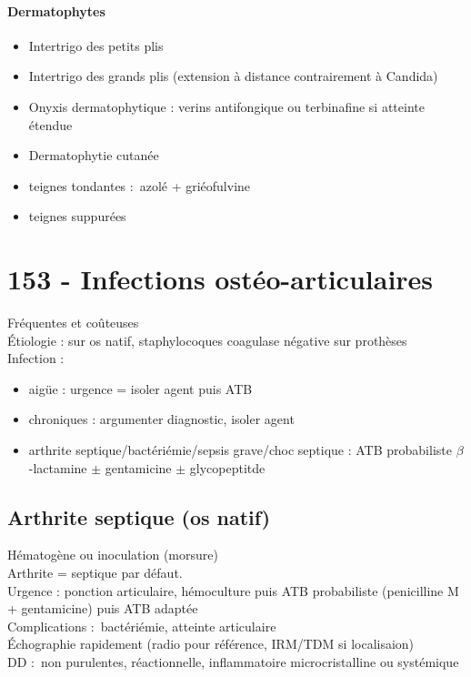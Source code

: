\paragraph{Dermatophytes}
\begin{itemize}
  \item Intertrigo des petits plis
  \item Intertrigo des grands plis (extension à distance contrairement à Candida)
  \item Onyxis dermatophytique : verins antifongique ou terbinafine si atteinte
    étendue
  \item Dermatophytie cutanée
  \item teignes tondantes : azolé + griéofulvine
  \item teignes suppurées
\end{itemize}

\section{153 - Infections ostéo-articulaires}%
\label{sec:ue_6_153_infections_osteo_articulaires}
Fréquentes et coûteuses\\
Étiologie :  sur os natif, staphylocoques coagulase négative sur
prothèses\\
Infection :
\begin{itemize}
  \item aigüe : \danger urgence = isoler agent puis ATB
  \item chroniques : argumenter diagnostic, isoler agent
    \item arthrite septique/bactériémie/sepsis grave/choc septique : ATB
      probabiliste $\beta$-lactamine $\pm$ gentamicine $\pm$ glycopeptitde
\end{itemize}

\subsection{Arthrite septique (os natif)}
Hématogène ou inoculation (morsure)\\
Arthrite = septique par défaut. \\
Urgence  : ponction articulaire, hémoculture puis ATB probabiliste
(penicilline M + gentamicine) puis ATB adaptée\\
Complications : bactériémie, atteinte articulaire\\
Échographie rapidement (radio pour référence, IRM/TDM si localisaion)\\
DD : non purulentes, réactionnelle, inflammatoire microcristalline ou systémique

